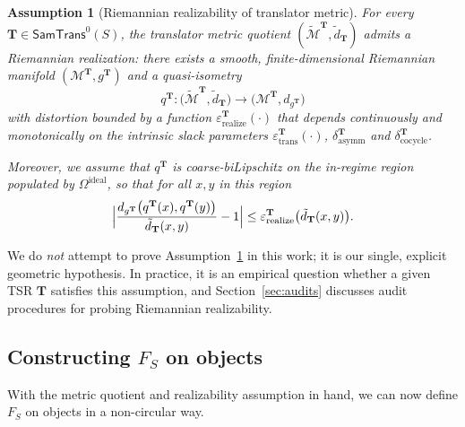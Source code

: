 \documentclass[11pt]{article}
\newtheorem{assumption}{Assumption}
\newcommand{\SamTrans}{\mathsf{SamTrans}}
\begin{document}
\begin{assumption}[Riemannian realizability of translator metric]
\label{assump:riemannian-realizability}
For every $\mathbf{T} \in \SamTrans^0(S)$, the translator metric
quotient $(\widetilde{\mathcal{M}}^{\mathbf{T}}, \tilde d_{\mathbf{T}})$
admits a Riemannian realization: there exists a smooth, finite-dimensional
Riemannian manifold $(\mathcal{M}^{\mathbf{T}}, g^{\mathbf{T}})$ and
a quasi-isometry
\[
q^{\mathbf{T}} :
\bigl(\widetilde{\mathcal{M}}^{\mathbf{T}}, \tilde d_{\mathbf{T}}\bigr)
\longrightarrow
\bigl(\mathcal{M}^{\mathbf{T}}, d_{g^{\mathbf{T}}}\bigr)
\]
with distortion bounded by a function
$\varepsilon_{\mathrm{realize}}^{\mathbf{T}}(\cdot)$ that depends
continuously and monotonically on the intrinsic slack parameters
$\varepsilon_{\mathrm{trans}}^{\mathbf{T}}(\cdot)$,
$\delta_{\mathrm{asymm}}^{\mathbf{T}}$ and
$\delta_{\mathrm{cocycle}}^{\mathbf{T}}$.

Moreover, we assume that $q^{\mathbf{T}}$ is coarse-biLipschitz on the
in-regime region populated by $\Omega^{\mathrm{ideal}}$, so that
for all $x,y$ in this region
\[
\Bigl|
  \frac{d_{g^{\mathbf{T}}}\bigl(q^{\mathbf{T}}(x), q^{\mathbf{T}}(y)\bigr)}
       {\tilde d_{\mathbf{T}}(x,y)}
  - 1
\Bigr|
\le
\varepsilon_{\mathrm{realize}}^{\mathbf{T}}
\bigl(\tilde d_{\mathbf{T}}(x,y)\bigr).
\]
\end{assumption}

We do \emph{not} attempt to prove
Assumption~\ref{assump:riemannian-realizability} in this work; it is our
single, explicit geometric hypothesis.  In practice, it is an empirical
question whether a given TSR $\mathbf{T}$ satisfies this assumption,
and Section~\ref{sec:audits} discusses audit procedures for probing
Riemannian realizability.

\subsection{Constructing \texorpdfstring{$F_S$}{F\_S} on objects}
\label{subsec:F-on-objects}

With the metric quotient and realizability assumption in hand, we can
now define $F_S$ on objects in a non-circular way.
\end{document}
